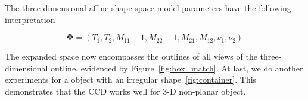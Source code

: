The three-dimensional affine shape-space model parameters have
the following interpretation

\begin{equation}
  \label{eq:4.19}
  \mathbf{\Phi} =  (T_1, T_2, M_{11} - 1, M_{22} - 1, M_{21}, M_{12}, \nu_1, \nu_2)
\end{equation}

The expanded space now encompasses the outlines of all views of the three-dimensional
outline, evidenced by Figure~\ref{fig:box_match}. At last, we do
another experiments for a object with an irregular shape~\ref{fig:container}. This
demonstrates that the CCD works well for 3-D non-planar object.

\begin{figure}[htbp] 
  \begin{minipage}[t]{0.5\linewidth} 
    \centering 
  \end{minipage}%
  \begin{minipage}[t]{0.5\linewidth} 
    \centering 
  \end{minipage} 
  \begin{minipage}[t]{0.5\linewidth} 
    \centering 

\end{minipage}
\end{figure}
